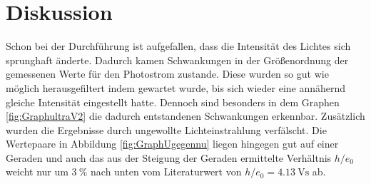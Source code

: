 
\section{Diskussion}
\label{sec:Diskussion}

Schon bei der Durchführung ist aufgefallen, dass die Intensität des Lichtes sich sprunghaft änderte. Dadurch kamen Schwankungen in der Größenordnung der gemessenen Werte für den Photostrom zustande. Diese wurden so gut wie möglich herausgefiltert indem gewartet wurde, bis sich wieder eine annähernd gleiche Intensität eingestellt hatte. Dennoch sind besonders in dem Graphen \ref{fig:GraphultraV2} die dadurch entstandenen Schwankungen erkennbar. Zusätzlich wurden die Ergebnisse durch ungewollte Lichteinstrahlung verfälscht. Die Wertepaare in Abbildung \ref{fig:GraphUgegennu} liegen hingegen gut auf einer Geraden und auch das aus der Steigung der Geraden ermittelte Verhältnis $h/e_0$ weicht nur um $\SI{3}{\percent}$ nach unten vom Literaturwert von $h/e_0=\SI{4.13}{\volt\second}$ \cite{nistgov} ab.
